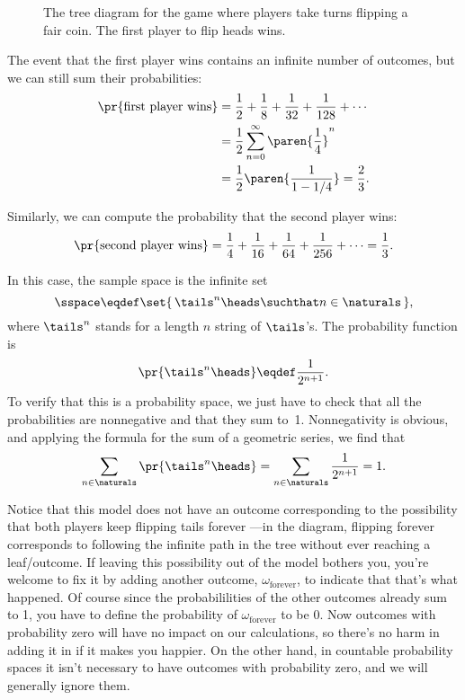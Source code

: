 \begin{figure}


\caption{The tree diagram for the game where players take turns
  flipping a fair coin.  The first player to flip heads wins.}

\label{fig:14A15}

\end{figure}

The event that the first player wins contains an infinite number of
outcomes, but we can still sum their probabilities:
\begin{align*}
\pr{\text{first player wins}}
    & = \frac{1}{2} + \frac{1}{8} + \frac{1}{32} + \frac{1}{128} + \cdots \\
    & = \frac{1}{2} \sum_{n=0}^\infty \paren{\frac{1}{4}}^n \\
    & = \frac{1}{2}\paren{\frac{1}{1-1/4}} = \frac{2}{3}.
\end{align*}

Similarly, we can compute the probability that the second player wins:
\begin{align*}
\pr{\text{second player wins}}
     = \frac{1}{4} + \frac{1}{16} + \frac{1}{64} + \frac{1}{256}
                      + \cdots %
     = \frac{1}{3}.
\end{align*}

In this case, the sample space is the infinite set
\[
    \sspace \eqdef \set{\, \tails^n\heads \suchthat n \in \naturals \,},
\]
where $\tails^n$ stands for a length $n$ string of $\tails$'s.
The probability function is
\[
\pr{\tails^n\heads} \eqdef \frac{1}{2^{n+1}}.
\]
To verify that this is a probability space, we just have to check that
all the probabilities are nonnegative and that they sum to~1.
Nonnegativity is obvious, and applying the formula for the sum of a
geometric series, we find that
\begin{equation*}
\sum_{n \in \naturals} \pr{\tails^n\heads}
    = \sum_{n \in \naturals} \frac{1}{2^{n+1}} \\
    = 1.
\end{equation*}

Notice that this model does not have an outcome corresponding to the
possibility that both players keep flipping tails forever ---in the
diagram, flipping forever corresponds to following the infinite path
in the tree without ever reaching a leaf/outcome.  If leaving this
possibility out of the model bothers you, you're welcome to fix it by
adding another outcome, $\omega_{\text{forever}}$, to indicate that that's
what happened.  Of course since the probabililities of the other
outcomes already sum to 1, you have to define the probability of
$\omega_{\text{forever}}$ to be 0.  Now outcomes with probability zero will
have no impact on our calculations, so there's no harm in adding it in
if it makes you happier.  On the other hand, in countable probability
spaces it isn't necessary to have outcomes with probability zero, and
we will generally ignore them.

